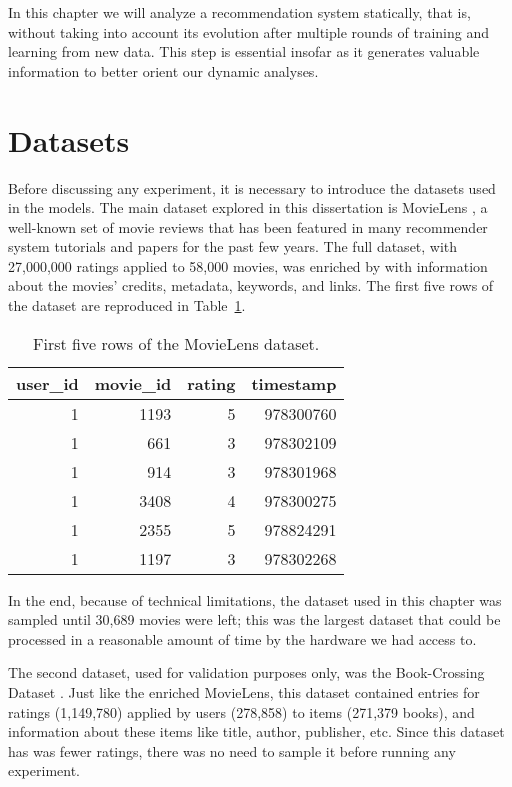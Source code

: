 In this chapter we will analyze a recommendation system statically, that is,
without taking into account its evolution after multiple rounds of training and
learning from new data. This step is essential insofar as it generates valuable
information to better orient our dynamic analyses.

\section{Datasets}
\label{sec:datasets03}

Before discussing any experiment, it is necessary to introduce the datasets used
in the models. The main dataset explored in this dissertation is MovieLens
\citep{harper_movielens_2015}, a well-known set of movie reviews that has been
featured in many recommender system tutorials and papers for the past few years.
The full dataset, with 27,000,000 ratings applied to 58,000 movies, was enriched
by \citet{banik_movies_2017} with information about the movies' credits,
metadata, keywords, and links. The first five rows of the dataset are reproduced
in Table~\ref{tab:tab03_head}.

\begin{table}[h]
  \begin{tabular}{ |r|r|r|r| }
    \hline
    user\_id & movie\_id & rating & timestamp\\
    \hline
    1 & 1193 & 5 & 978300760\\
    \hline
    1 & 661 & 3 & 978302109\\
    \hline
    1 & 914 & 3 & 978301968\\
    \hline
    1 & 3408 & 4 & 978300275\\
    \hline
    1 & 2355 & 5 & 978824291\\
    \hline
    1 & 1197 & 3 & 978302268\\
    \hline
  \end{tabular}

  \caption{First five rows of the MovieLens dataset.}
  \label{tab:tab03_head}
\end{table}

In the end, because of technical limitations, the dataset used in this chapter
was sampled until 30,689 movies were left; this was the largest dataset that
could be processed in a reasonable amount of time by the hardware we had access
to.

The second dataset, used for validation purposes only, was the Book-Crossing
Dataset \citep{ziegler_book-crossing_2004}. Just like the enriched MovieLens,
this dataset contained entries for ratings (1,149,780) applied by users
(278,858) to items (271,379 books), and information about these items like
title, author, publisher, etc. Since this dataset has was fewer ratings, there
was no need to sample it before running any experiment.

